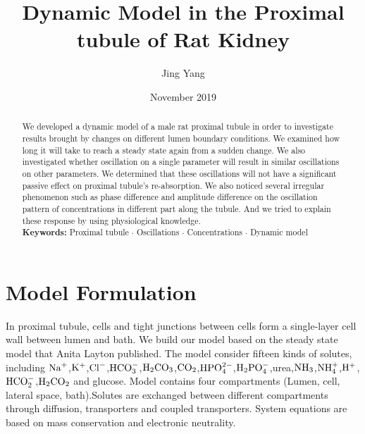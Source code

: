 \documentclass{article}
\title{Dynamic Model in the Proximal tubule of Rat Kidney}
\author{Jing Yang}
\date{November 2019}
\begin{document}
\maketitle

\begin{abstract}
We developed a dynamic model of a male rat proximal tubule in order to investigate results brought by changes on different lumen boundary conditions. We examined how long it will take to reach a steady state again from a sudden change. We also investigated whether oscillation on a single parameter will result in similar oscillations on other parameters. We determined that these oscillations will not have a significant passive effect on proximal tubule's re-absorption. We also noticed several irregular phenomenon such as phase difference and amplitude difference on the oscillation pattern of concentrations in different part along the tubule. And we tried to explain these response by using physiological knowledge.\\

\noindent \textbf{Keywords: }Proximal tubule $\cdot$ Oscillations $\cdot$ Concentrations $\cdot$ Dynamic model
\end{abstract}


\section{Model Formulation}
In proximal tubule, cells and tight junctions between cells form a single-layer cell wall between lumen and bath. We build our model based on the steady state model that Anita Layton published\citep{layton2014mathematical}. The model consider fifteen kinds of solutes, including $\rm {Na}^{+}$,$\rm {K}^{+}$,$\rm {Cl}^{-}$,$\rm {HCO}_{3}^{-}$,$\rm H_{2}CO_{3}$,$\rm CO_{2}$,$\rm HPO_{4}^{2-}$,$\rm H_{2}PO_{4}^{-}$,urea,$\rm NH_{3}$,$\rm NH_{4}^{+}$,$\rm H^{+}$,\\$\rm HCO_{2}^{-}$,$\rm H_{2}CO_2$ and glucose. Model contains four compartments (Lumen, cell, lateral space, bath).Solutes are exchanged between different compartments through diffusion, transporters and coupled transporters. System equations are based on mass conservation and electronic neutrality. 
\end{document}
